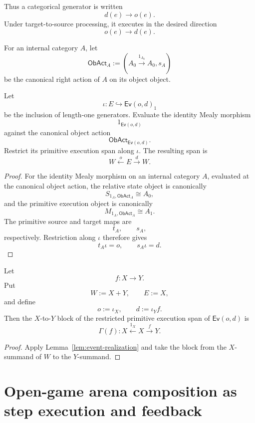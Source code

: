 Thus a categorical generator is written
\[
  d(e)\longrightarrow o(e).
\]
Under target-to-source processing, it executes in the desired direction
\[
  o(e)\longrightarrow d(e).
\]

For an internal category \(A\), let
\[
  \mathsf{ObAct}_A
  :=
  (A_0\xrightarrow{1_{A_0}}A_0,s_A)
\]
be the canonical right action of \(A\) on its object object.

\begin{lemma}
\label{lem:event-realization}
Let
\[
  \iota:E\hookrightarrow\mathsf{Ev}(o,d)_1
\]
be the inclusion of length-one generators. Evaluate the identity Mealy morphism
\[
  1_{\mathsf{Ev}(o,d)}
\]
against the canonical object action
\[
  \mathsf{ObAct}_{\mathsf{Ev}(o,d)}.
\]
Restrict its primitive execution span along \(\iota\). The resulting span is
\[
  \boxed{
  W\xleftarrow{o}E\xrightarrow{d}W.
  }
\]
\end{lemma}

\begin{proof}
For the identity Mealy morphism on an internal category \(A\), evaluated at the canonical object
action, the relative state object is canonically
\[
  S_{1_A,\mathsf{ObAct}_A}\cong A_0,
\]
and the primitive execution object is canonically
\[
  M_{1_A,\mathsf{ObAct}_A}\cong A_1.
\]
The primitive source and target maps are
\[
  t_A,
  \qquad
  s_A,
\]
respectively. Restriction along \(\iota\) therefore gives
\[
  t_A\iota=o,
  \qquad
  s_A\iota=d.
\]
\end{proof}

\begin{corollary}
\label{cor:graph-spans-as-event-execution}
Let
\[
  f:X\to Y.
\]
Put
\[
  W:=X+Y,
  \qquad
  E:=X,
\]
and define
\[
  o:=\iota_X,
  \qquad
  d:=\iota_Yf.
\]
Then the \(X\)-to-\(Y\) block of the restricted primitive execution span of
\(\mathsf{Ev}(o,d)\) is
\[
  \Gamma(f):
  X\xleftarrow{1_X}X\xrightarrow{f}Y.
\]
\end{corollary}

\begin{proof}
Apply Lemma~\ref{lem:event-realization} and take the block from the \(X\)-summand of \(W\) to the
\(Y\)-summand.
\end{proof}

\section{Open-game arena composition as step execution and feedback}
\label{sec:open-game-feedback}

